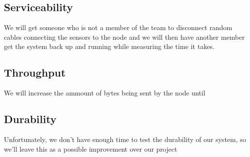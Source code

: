	\subsection{Serviceability}
		We will get someone who is not a member of the team to disconnect random cables connecting the sensors to the node and we will then have another member get the system back up and running while measuring the time it takes.

	\subsection{Throughput}
		We will increase the ammount of bytes being sent by the node until 

	\subsection{Durability}
		Unfortunately, we don’t have enough time to test the durability of our system, so we’ll leave this as a possible improvement over our project






